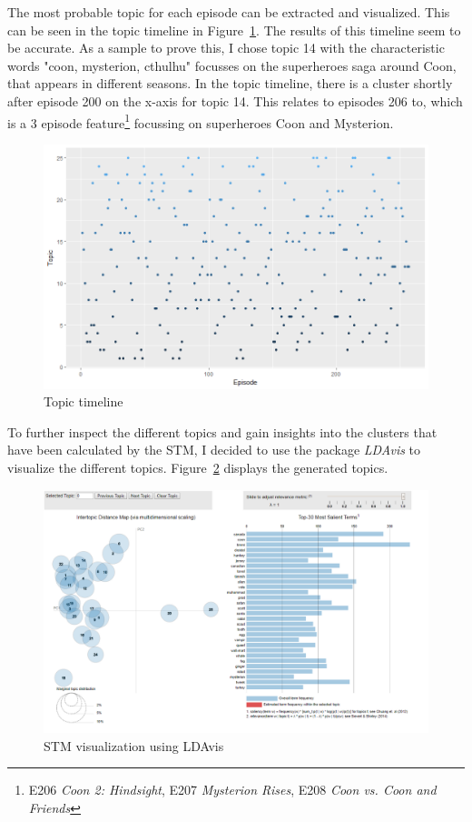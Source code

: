 \documentclass[10pt,a4paper]{article}
\begin{document}
	The most probable topic for each episode can be extracted and visualized. This can be seen in the topic timeline in Figure~\ref{fig:stmTimelineAll}. The results of this timeline seem to be accurate. As a sample to prove this, I chose topic 14 with the characteristic words "coon, mysterion, cthulhu" focusses on the superheroes saga around Coon, that appears in different seasons. In the topic timeline, there is a cluster shortly after episode 200 on the x-axis for topic 14. This relates to episodes 206 to, which is a 3 episode feature\footnote{E206 \textit{Coon 2: Hindsight}, E207 \textit{Mysterion Rises}, E208 \textit{Coon vs. Coon and Friends}} focussing on superheroes Coon and Mysterion.
	
	\begin{figure}[h]
	\centering
	\includegraphics[scale=0.5]{images/TopicsAllTimeline.png}
	\caption{Topic timeline}
	\label{fig:stmTimelineAll}
	\end{figure}	
	
	To further inspect the different topics and gain insights into the clusters that have been calculated by the STM, I decided to use the package \textit{LDAvis} to visualize the different topics. Figure~\ref{fig:stmLDAvis} displays the generated topics.
	
	\begin{figure}[h]
	\centering
	\includegraphics[scale=0.3]{images/LDAvis.png}
	\caption{STM visualization using LDAvis}
	\label{fig:stmLDAvis}
	\end{figure}	
	
\end{document}
